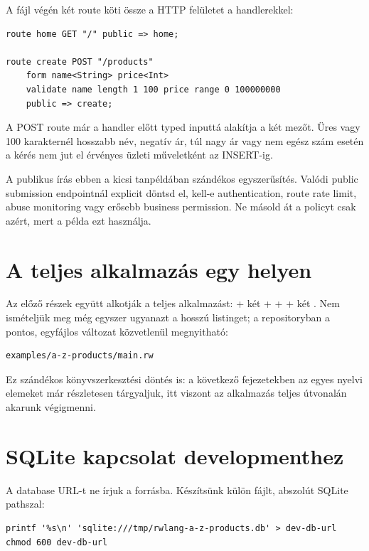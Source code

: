 A fájl végén két route köti össze a HTTP felületet a handlerekkel:

\begin{lstlisting}[language=RWLang]
route home GET "/" public => home;

route create POST "/products"
    form name<String> price<Int>
    validate name length 1 100 price range 0 100000000
    public => create;
\end{lstlisting}

A POST route már a handler előtt typed inputtá alakítja a két mezőt. Üres vagy 100 karakternél hosszabb név, negatív ár, túl nagy ár vagy nem egész szám esetén a kérés nem jut el érvényes üzleti műveletként az INSERT-ig.

A publikus írás ebben a kicsi tanpéldában szándékos egyszerűsítés. Valódi public submission endpointnál explicit döntsd el, kell-e authentication, route rate limit, abuse monitoring vagy erősebb business permission. Ne másold át a  policyt csak azért, mert a példa ezt használja.

\section{A teljes alkalmazás egy helyen}

Az előző részek együtt alkotják a teljes alkalmazást:  + két  +  +  + két . Nem ismételjük meg még egyszer ugyanazt a hosszú listinget; a repositoryban a pontos, egyfájlos változat közvetlenül megnyitható:

\begin{lstlisting}
examples/a-z-products/main.rw
\end{lstlisting}

Ez szándékos könyvszerkesztési döntés is: a következő fejezetekben az egyes nyelvi elemeket már részletesen tárgyaljuk, itt viszont az alkalmazás teljes útvonalán akarunk végigmenni.

\section{SQLite kapcsolat developmenthez}

A database URL-t ne írjuk a forrásba. Készítsünk külön fájlt, abszolút SQLite pathszal:

\begin{lstlisting}
printf '%s\n' 'sqlite:///tmp/rwlang-a-z-products.db' > dev-db-url
chmod 600 dev-db-url
\end{lstlisting}

